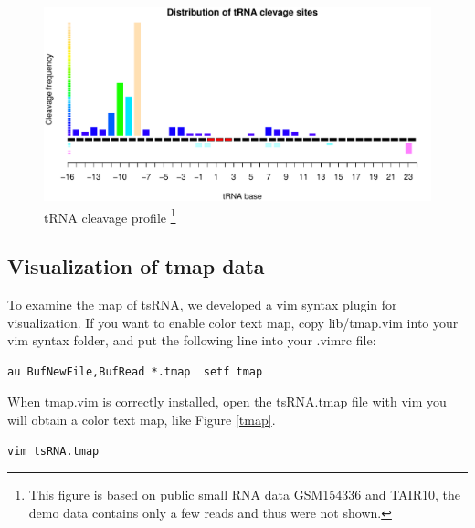 \documentclass[11pt, a4paper]{article}
\begin{document}
\begin{figure}[htbp]
\begin{center}
\includegraphics[width=13cm]{cleavage_profile.pdf}
\caption[Caption for LOF]{tRNA cleavage profile \footnote{This figure is based on public small RNA data GSM154336 and TAIR10, the demo data contains only a few reads and thus were not shown.}}
\label{cleavage}
\end{center}
\end{figure}

\subsection{Visualization of tmap data}

To examine the map of tsRNA, we developed a vim syntax plugin for visualization. If you want to enable color text map, copy lib/tmap.vim into your vim syntax folder, and put the following line into your .vimrc file:

{\footnotesize \begin{tcolorbox}[colback=blue!5!white,colframe=blue!75!black,title=Set filetype tmap in vim]
\begin{verbatim}
au BufNewFile,BufRead *.tmap  setf tmap
\end{verbatim}
\end{tcolorbox}}

When tmap.vim is correctly installed, open the tsRNA.tmap file with vim you will obtain a color text map, like Figure \ref{tmap}.

{\footnotesize \begin{tcolorbox}[colback=blue!5!white,colframe=blue!75!black,title=Visualization tsRNA.tmap]
\begin{verbatim}
vim tsRNA.tmap
\end{verbatim}
\end{tcolorbox}}
\end{document}
